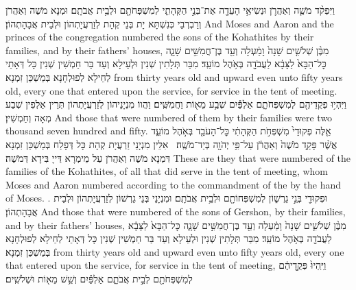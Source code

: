 {וַיִּפְקֹ֨ד מֹשֶׁ֧ה וְאַהֲרֹ֛ן וּנְשִׂיאֵ֥י הָעֵדָ֖ה אֶת־בְּנֵ֣י הַקְּהָתִ֑י לְמִשְׁפְּחֹתָ֖ם וּלְבֵ֥ית אֲבֹתָֽם׃}
{וּמְנָא מֹשֶׁה וְאַהֲרֹן וְרַבְרְבֵי כְּנִשְׁתָּא יָת בְּנֵי קְהָת לְזַרְעֲיָתְהוֹן וּלְבֵית אֲבָהָתְהוֹן׃}
{And Moses and Aaron and the princes of the congregation numbered the sons of the Kohathites by their families, and by their fathers’ houses,}{}
{מִבֶּ֨ן שְׁלֹשִׁ֤ים שָׁנָה֙ וָמַ֔עְלָה וְעַ֖ד בֶּן־חֲמִשִּׁ֣ים שָׁנָ֑ה כׇּל־הַבָּא֙ לַצָּבָ֔א לַעֲבֹדָ֖ה בְּאֹ֥הֶל מוֹעֵֽד׃}
{מִבַּר תְּלָתִין שְׁנִין וּלְעֵילָא וְעַד בַּר חַמְשִׁין שְׁנִין כָּל דְּאָתֵי לְחֵילָא לְפוּלְחָנָא בְּמַשְׁכַּן זִמְנָא׃}
{from thirty years old and upward even unto fifty years old, every one that entered upon the service, for service in the tent of meeting.}{}
{וַיִּהְי֥וּ פְקֻדֵיהֶ֖ם לְמִשְׁפְּחֹתָ֑ם אַלְפַּ֕יִם שְׁבַ֥ע מֵא֖וֹת וַחֲמִשִּֽׁים׃}
{וַהֲווֹ מִנְיָנֵיהוֹן לְזַרְעֲיָתְהוֹן תְּרֵין אַלְפִין שְׁבַע מְאָה וְחַמְשִׁין׃}
{And those that were numbered of them by their families were two thousand seven hundred and fifty.}{}
{אֵ֤לֶּה פְקוּדֵי֙ מִשְׁפְּחֹ֣ת הַקְּהָתִ֔י כׇּל־הָעֹבֵ֖ד בְּאֹ֣הֶל מוֹעֵ֑ד אֲשֶׁ֨ר פָּקַ֤ד מֹשֶׁה֙ וְאַהֲרֹ֔ן עַל־פִּ֥י יְהֹוָ֖ה בְּיַד־מֹשֶֽׁה׃ \setuma }
{אִלֵּין מִנְיָנֵי זַרְעֲיָת קְהָת כָּל דְּפָלַח בְּמַשְׁכַּן זִמְנָא דִּמְנָא מֹשֶׁה וְאַהֲרֹן עַל מֵימְרָא דַּייָ בִּידָא דְּמֹשֶׁה׃}
{These are they that were numbered of the families of the Kohathites, of all that did serve in the tent of meeting, whom Moses and Aaron numbered according to the commandment of the \lord\space by the hand of Moses. .}{}
{וּפְקוּדֵ֖י בְּנֵ֣י גֵרְשׁ֑וֹן לְמִשְׁפְּחוֹתָ֖ם וּלְבֵ֥ית אֲבֹתָֽם׃}
{וּמִנְיָנֵי בְּנֵי גֵרְשׁוֹן לְזַרְעֲיָתְהוֹן וּלְבֵית אֲבָהָתְהוֹן׃}
{And those that were numbered of the sons of Gershon, by their families, and by their fathers’ houses,}{}
{מִבֶּ֨ן שְׁלֹשִׁ֤ים שָׁנָה֙ וָמַ֔עְלָה וְעַ֖ד בֶּן־חֲמִשִּׁ֣ים שָׁנָ֑ה כׇּל־הַבָּא֙ לַצָּבָ֔א לַעֲבֹדָ֖ה בְּאֹ֥הֶל מוֹעֵֽד׃}
{מִבַּר תְּלָתִין שְׁנִין וּלְעֵילָא וְעַד בַּר חַמְשִׁין שְׁנִין כָּל דְּאָתֵי לְחֵילָא לְפוּלְחָנָא בְּמַשְׁכַּן זִמְנָא׃}
{from thirty years old and upward even unto fifty years old, every one that entered upon the service, for service in the tent of meeting,}{}
{וַיִּֽהְיוּ֙ פְּקֻ֣דֵיהֶ֔ם לְמִשְׁפְּחֹתָ֖ם לְבֵ֣ית אֲבֹתָ֑ם אַלְפַּ֕יִם וְשֵׁ֥שׁ מֵא֖וֹת וּשְׁלֹשִֽׁים׃}
